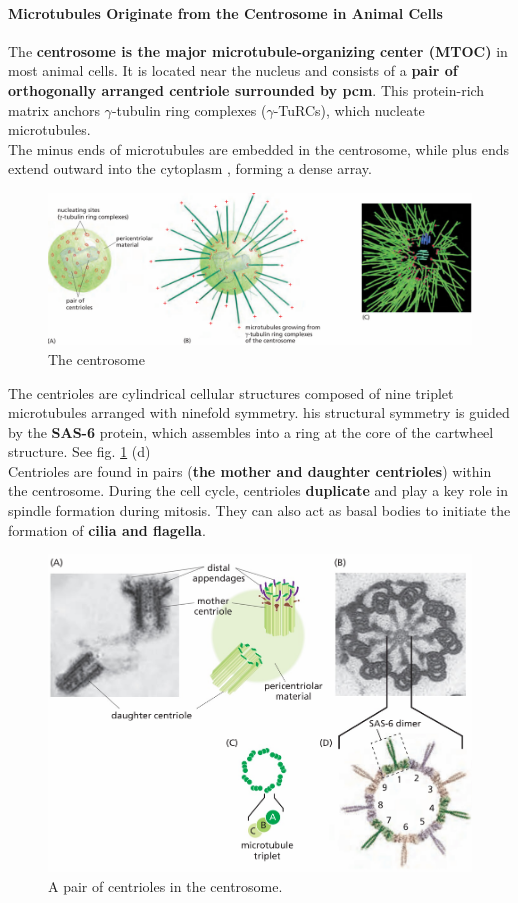 \documentclass[../main.tex]{subfiles}
\begin{document}
\paragraph{Microtubules Originate from the Centrosome in Animal Cells}
The \textbf{\gls{centrosome} is the major microtubule-organizing center (MTOC)} in most animal cells. It is located near the nucleus and consists of a \textbf{pair of orthogonally arranged \gls{centriole} surrounded by \gls{pcm}}.  This protein-rich matrix anchors $\gamma$-tubulin ring complexes ($\gamma$-TuRCs), which nucleate microtubules. \\
\indent The minus ends of microtubules are embedded in the centrosome, while plus ends extend outward into the cytoplasm , forming a dense array.
\begin{figure}[H]
	\centering
	\includegraphics[width = 0.7 \textwidth]{26}
	\caption{The centrosome}
\end{figure}

The centrioles are cylindrical cellular structures composed of nine triplet microtubules arranged with ninefold symmetry. his structural symmetry is guided by the \textbf{\gls{SAS-6}} protein, which assembles into a ring at the core of the cartwheel structure. See fig. \ref{pairOfcentrioles} (d)\\
\indent Centrioles are found in pairs (\textbf{the mother and daughter centrioles}) within the centrosome. During the cell cycle, centrioles \textbf{duplicate} and play a key role in spindle formation during mitosis. They can also act as basal bodies to initiate the formation of \textbf{cilia and flagella}. 

\begin{figure}[H]
	\centering
	\includegraphics[width = 0.7 \textwidth]{27}
	\caption{A pair of centrioles in the centrosome.}
	\label{pairOfcentrioles}
\end{figure}
\end{document}
